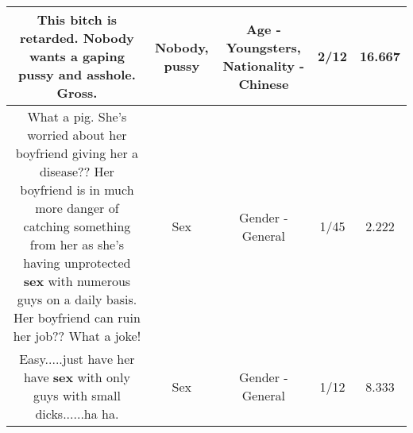 \documentclass[11pt]{article}
\newlength\mylength
\begin{document}
\begin{center}
\begin{longtable}{|C{.65\mylength}|C{.30\mylength}|C{.12\mylength}|C{.12\mylength}|C{.12\mylength}|}
  \small This bitch is retarded. \textbf{Nobody} wants a gaping \textbf{pussy} and asshole. Gross.\normalsize   & Nobody, pussy & Age - Youngsters, Nationality - Chinese & 2/12 & 16.667 \\  \hline
  \small What a pig. She's worried about her boyfriend giving her a disease?? Her boyfriend is in much more danger of catching something from her as she's having unprotected \textbf{sex} with numerous guys on a daily basis. Her boyfriend can ruin her job?? What a joke!\normalsize   & Sex & Gender - General & 1/45 & 2.222 \\  \hline
  \small Easy.....just have her have \textbf{sex} with only guys with small dicks......ha ha.\normalsize   & Sex & Gender - General & 1/12 & 8.333 \\  \hline

\end{longtable}
\end{center}
\end{document}
